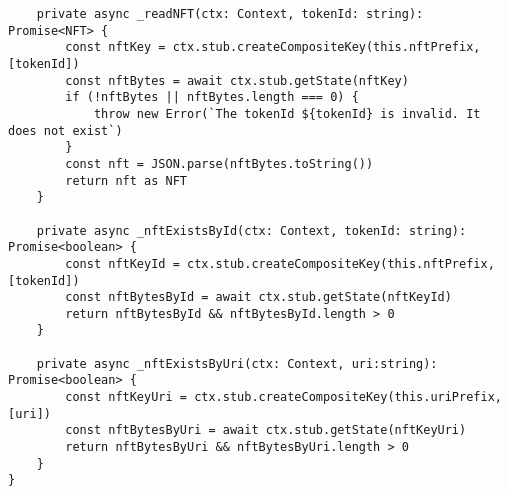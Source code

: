 \begin{lstlisting}
    private async _readNFT(ctx: Context, tokenId: string): Promise<NFT> {
        const nftKey = ctx.stub.createCompositeKey(this.nftPrefix, [tokenId])
        const nftBytes = await ctx.stub.getState(nftKey)
        if (!nftBytes || nftBytes.length === 0) {
            throw new Error(`The tokenId ${tokenId} is invalid. It does not exist`)
        }
        const nft = JSON.parse(nftBytes.toString())
        return nft as NFT
    }

    private async _nftExistsById(ctx: Context, tokenId: string): Promise<boolean> {
        const nftKeyId = ctx.stub.createCompositeKey(this.nftPrefix, [tokenId])
        const nftBytesById = await ctx.stub.getState(nftKeyId)
        return nftBytesById && nftBytesById.length > 0
    }

    private async _nftExistsByUri(ctx: Context, uri:string): Promise<boolean> {
        const nftKeyUri = ctx.stub.createCompositeKey(this.uriPrefix, [uri])
        const nftBytesByUri = await ctx.stub.getState(nftKeyUri)
        return nftBytesByUri && nftBytesByUri.length > 0
    }
}
\end{lstlisting}
